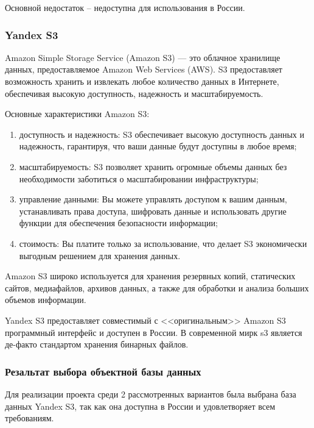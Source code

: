 Основной недостаток -- недоступна для использования в России.


\subsubsection{Yandex S3}

Amazon Simple Storage Service (Amazon S3) --- это облачное хранилище данных, предоставляемое Amazon Web Services (AWS). S3 предоставляет возможность хранить и извлекать любое количество данных в Интернете, обеспечивая высокую доступность, надежность и масштабируемость.

Основные характеристики Amazon S3:

\begin{enumerate}
	
	\item доступность и надежность: S3 обеспечивает высокую доступность данных и надежность, гарантируя, что ваши данные будут доступны в любое время;

	\item масштабируемость: S3 позволяет хранить огромные объемы данных без необходимости заботиться о масштабировании инфраструктуры;

	\item управление данными: Вы можете управлять доступом к вашим данным, устанавливать права доступа, шифровать данные и использовать другие функции для обеспечения безопасности информации;

	\item стоимость: Вы платите только за использование, что делает S3 экономически выгодным решением для хранения данных.
\end{enumerate}

Amazon S3 широко используется для хранения резервных копий, статических сайтов, медиафайлов, архивов данных, а также для обработки и анализа больших объемов информации.

Yandex S3 предоставляет совместимый с <<оригинальным>> Amazon S3 программный интерфейс и доступен в России. В современной мирк s3 является де-факто стандартом хранения бинарных файлов.

\subsubsection{Резальтат выбора объектной базы данных}

Для реализации проекта среди 2 рассмотренных вариантов была выбрана база данных Yandex S3, так как она доступна в России и удовлетворяет всем требованиям.


